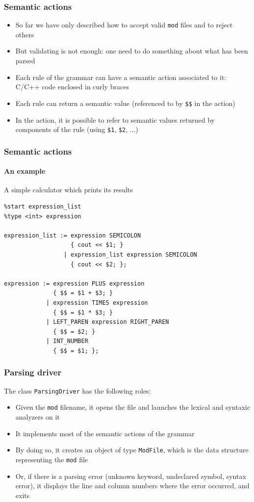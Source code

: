\documentclass{beamer}
\begin{document}
\begin{frame}
\frametitle{Semantic actions}
\begin{itemize}
\item So far we have only described how to accept valid \texttt{mod} files and to reject others
\item But validating is not enough: one need to do something about what has been parsed
\item Each rule of the grammar can have a \alert{semantic action} associated to it: C/C++ code enclosed in curly braces
\item Each rule can return a semantic value (referenced to by \texttt{\$\$} in the action)
\item In the action, it is possible to refer to semantic values returned by components of the rule (using \texttt{\$1}, \texttt{\$2}, ...)
\end{itemize}
\end{frame}

\begin{frame}[fragile]
\frametitle{Semantic actions}
\framesubtitle{An example}
\begin{block}{A simple calculator which prints its results}
\begin{footnotesize}
\begin{verbatim}
%start expression_list
%type <int> expression

expression_list := expression SEMICOLON
                   { cout << $1; }
                 | expression_list expression SEMICOLON
                   { cout << $2; };

expression := expression PLUS expression
              { $$ = $1 + $3; }
            | expression TIMES expression
              { $$ = $1 * $3; }
            | LEFT_PAREN expression RIGHT_PAREN
              { $$ = $2; }
            | INT_NUMBER
              { $$ = $1; };
\end{verbatim}
\end{footnotesize}
\end{block}
\end{frame}

\begin{frame}
\frametitle{Parsing driver}

The class \texttt{ParsingDriver} has the following roles:
\begin{itemize}
\item Given the \texttt{mod} filename, it opens the file and launches the lexical and syntaxic analyzers on it
\item It implements most of the semantic actions of the grammar
\item By doing so, it creates an object of type \texttt{ModFile}, which is the data structure representing the \texttt{mod} file
\item Or, if there is a parsing error (unknown keyword, undeclared symbol, syntax error), it displays the line and column numbers where the error occurred, and exits
\end{itemize}
\end{frame}
\end{document}
